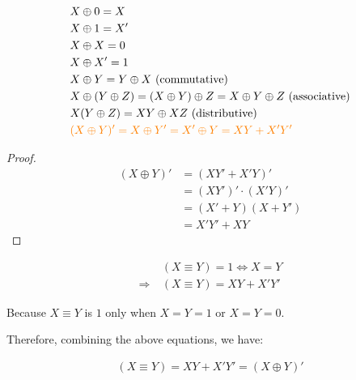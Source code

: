 \documentclass{article}
\begin{document}
\begin{tcolorbox}[greenbox, title=Properties of Exclusive-OR, coltitle=black]
    {
    \begin{align*}
        &X \oplus 0 = X \\
        &X \oplus 1 = X' \\
        &X \oplus X     = 0 \\
        &X \oplus X' = 1 \\
        &X \oplus Y = Y \oplus X \ \text{(commutative)}\\
        &X \oplus (Y \oplus Z) = (X \oplus Y) \oplus Z  = X \oplus Y \oplus Z \ \text{(associative)}\\
        &X(Y \oplus Z) = XY \oplus XZ \ \text{(distributive)}\\
        &\textcolor{orange}{(X \oplus Y)' = X \oplus Y'  = X' \oplus Y = XY + X'Y'}\\
    \end{align*}
    }
\end{tcolorbox}

\begin{proof}
    \begin{align*}
        (X \oplus Y)'
        &= (XY' + X'Y)' \\
        &= (XY')' \cdot (X'Y)' \\
        &= (X' + Y)(X + Y') \\
        &= X'Y' + XY 
    \end{align*}
\end{proof}

\begin{tcolorbox}[greenbox, title=Equivalence Relation, coltitle=black]
    {
    \begin{align*}
        &(X \equiv Y)  = 1 \iff X = Y \\
        \Rightarrow \ & (X \equiv Y) = XY + X'Y'
    \end{align*}
    }
\end{tcolorbox}

Because $X \equiv Y$ is $1$ only when $X = Y = 1$ or $X = Y = 0$.
\bigskip

Therefore, combining the above equations, we have:

\begin{tcolorbox}[yellowbox, title=Equivalence is the complement of exclusive-OR, coltitle=black]
    {
    \begin{align*}
        (X \equiv Y) = XY + X'Y' = (X \oplus Y)'
    \end{align*}
    }
\end{tcolorbox}
\end{document}
